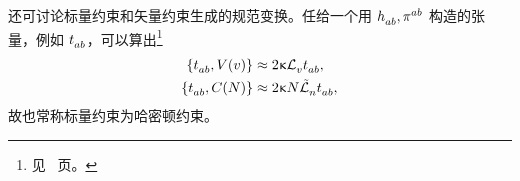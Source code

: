 
		还可讨论标量约束和矢量约束生成的规范变换。任给一个用 $\tensor{h}{_a_b}, \tensor{\pi}{^a^b}$ 构造的张量，例如 $\tensor{t}{_a_b}$，可以算出\footnote{见~\pageref{ap-eq-tab} 页。}
		\begin{equation}
			\begin{split}
				\left\{ \tensor{t}{_a_b}, V(v) \right\} &\approx 2\gkappa \Ld{v} \tensor{t}{_a_b},\\
				\left\{ \tensor{t}{_a_b}, C(N) \right\} & \approx 2 \gkappa N \spaceLd{n} \tensor{t}{_a_b}, \label{eq-tab}
			\end{split}
		\end{equation}
		故也常称标量约束为哈密顿约束。

